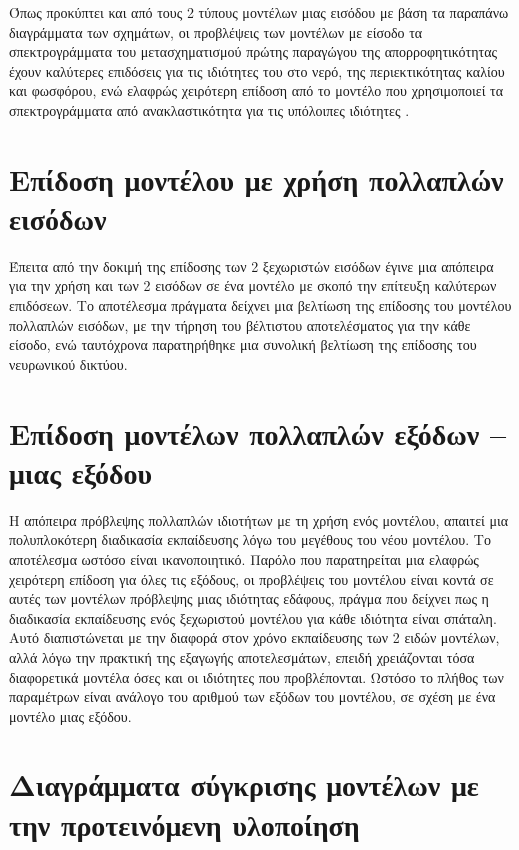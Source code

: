 Όπως προκύπτει και από τους 2 τύπους μοντέλων μιας εισόδου με βάση τα παραπάνω διαγράμματα των σχημάτων, οι προβλέψεις των μοντέλων με είσοδο τα σπεκτρογράμματα του μετασχηματισμού  πρώτης παραγώγου της απορροφητικότητας έχουν καλύτερες επιδόσεις για τις ιδιότητες του  στο νερό, της περιεκτικότητας καλίου και φωσφόρου, ενώ ελαφρώς χειρότερη επίδοση από το μοντέλο που χρησιμοποιεί τα σπεκτρογράμματα από ανακλαστικότητα για τις υπόλοιπες ιδιότητες .

\section{Επίδοση μοντέλου με χρήση πολλαπλών εισόδων}
Έπειτα από την δοκιμή της επίδοσης των 2 ξεχωριστών εισόδων έγινε μια απόπειρα για την χρήση και των 2 εισόδων σε ένα μοντέλο με σκοπό την επίτευξη καλύτερων επιδόσεων. Το αποτέλεσμα πράγματα δείχνει μια βελτίωση της επίδοσης του μοντέλου πολλαπλών εισόδων, με την τήρηση του βέλτιστου αποτελέσματος για την κάθε είσοδο, ενώ ταυτόχρονα παρατηρήθηκε μια συνολική βελτίωση της επίδοσης του νευρωνικού δικτύου.

\section{Επίδοση μοντέλων πολλαπλών εξόδων -- μιας εξόδου}
Η απόπειρα πρόβλεψης πολλαπλών ιδιοτήτων με τη χρήση ενός μοντέλου, απαιτεί μια πολυπλοκότερη διαδικασία εκπαίδευσης λόγω του μεγέθους του νέου μοντέλου. Το αποτέλεσμα ωστόσο είναι ικανοποιητικό. Παρόλο που παρατηρείται μια ελαφρώς χειρότερη επίδοση για όλες τις εξόδους, οι προβλέψεις του μοντέλου είναι κοντά σε αυτές των μοντέλων πρόβλεψης μιας ιδιότητας εδάφους, πράγμα που δείχνει πως η διαδικασία εκπαίδευσης ενός ξεχωριστού μοντέλου για κάθε ιδιότητα είναι σπάταλη. Αυτό διαπιστώνεται με την διαφορά στον χρόνο εκπαίδευσης των 2 ειδών μοντέλων, αλλά λόγω την πρακτική της εξαγωγής αποτελεσμάτων, επειδή χρειάζονται τόσα διαφορετικά μοντέλα όσες και οι ιδιότητες που προβλέπονται. Ωστόσο το πλήθος των παραμέτρων είναι ανάλογο του αριθμού των εξόδων του μοντέλου, σε σχέση με ένα μοντέλο μιας εξόδου.

\section{Διαγράμματα σύγκρισης μοντέλων με την προτεινόμενη υλοποίηση}

